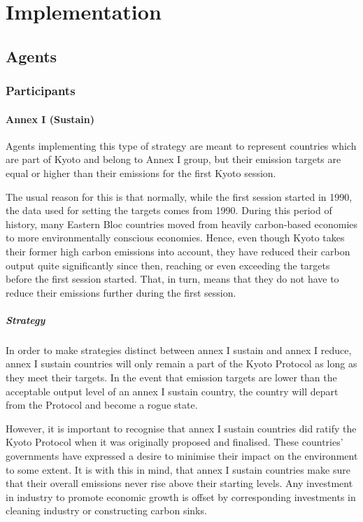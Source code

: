 \section{Implementation}

\subsection{Agents}

%
%

\subsubsection{Participants}

%
%

\paragraph{Annex I (Sustain)}

Agents implementing this type of strategy are meant to represent countries which are part of Kyoto and belong to Annex I group, but their emission targets are equal or higher than their emissions for the first Kyoto session.

The usual reason for this is that normally, while the first session started in 1990, the data used for setting the targets comes from 1990. During this period of history, many Eastern Bloc countries moved from heavily carbon-based economies to more environmentally conscious economies. Hence, even though Kyoto takes their former high carbon emissions into account, they have reduced their carbon output quite significantly since then, reaching or even exceeding the targets before the first session started. That, in turn, means that they do not have to reduce their emissions further during the first session.

\subparagraph{Strategy}

In order to make strategies distinct between annex I sustain and annex I reduce, annex I sustain countries will only remain a part of the Kyoto Protocol as long as they meet their targets. In the event that emission targets are lower than the acceptable output level of an annex I sustain country, the country will depart from the Protocol and become a rogue state. 

However, it is important to recognise that annex I sustain countries did ratify the Kyoto Protocol when it was originally proposed and finalised. These countries' governments have expressed a desire to minimise their impact on the environment to some extent. It is with this in mind, that annex I sustain countries make sure that their overall emissions never rise above their starting levels. Any investment in industry to promote economic growth is offset by corresponding investments in cleaning industry or constructing carbon sinks.

